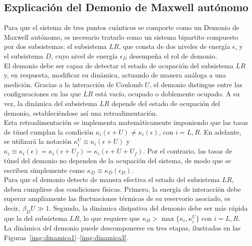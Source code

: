 \label{sec5:modelo}


\subsection{Explicación del Demonio de Maxwell autónomo}
\label{explicaciondem}
Para que el sistema de tres puntos cuánticos se comporte como un Demonio de Maxwell autónomo, es necesario tratarlo como un sistema bipartito compuesto por dos subsistemas: el subsistema $LR$, que consta de dos niveles de energía $\epsilon$, y el subsistema $D$, cuyo nivel de energía $\epsilon_D$ desempeña el rol de demonio.
\\

El demonio debe ser capaz de detectar el estado de ocupación del subsistema $LR$ y, en respuesta, modificar su dinámica, actuando de manera análoga a una medición. Gracias a la interacción de Coulomb $U$, el demonio distingue entre las configuraciones en las que $LR$ está vacío, ocupado o doblemente ocupado. A su vez, la dinámica del subsistema $LR$ depende del estado de ocupación del demonio, estableciéndose así una retroalimentación.
\\

Esta retroalimentación se implementa matemáticamente imponiendo que las tasas de túnel cumplan la condición $\kappa_{i}(\epsilon + U) \neq \kappa_{i}(\epsilon)$, con $i = L, R$. En adelante, se utilizará la notación $\kappa^{U}_{i} \equiv \kappa_{i}(\epsilon+U)$ y $\kappa_{i} \equiv \kappa_{i}(\epsilon)=\kappa_{i}(\epsilon+U_{f})=\kappa_{i}(\epsilon+U+U_{f})$. Por el contrario, las tasas de túnel del demonio no dependen de la ocupación del sistema, de modo que se escriben simplemente como $\kappa_{D}\equiv \kappa_{D}(\epsilon_D)$.
\\

Para que el demonio detecte de manera efectiva el estado del subsistema $LR$, deben cumplirse dos condiciones físicas. Primero, la energía de interacción debe superar ampliamente las fluctuaciones térmicas de su reservorio asociado, es decir, $\beta_{D} U \gg 1$. Segundo, la dinámica disipativa del demonio debe ser más rápida que la del subsistema $LR$, lo que requiere que $\kappa_{D} > \max\{\kappa_{i}, \kappa^{U}_{i}\}$ con $i = L, R$.
\\

La dinámica del demonio puede descomponerse en tres etapas, ilustradas en las Figuras~\ref{img:dinamica1}–\ref{img:dinamica3}.  


